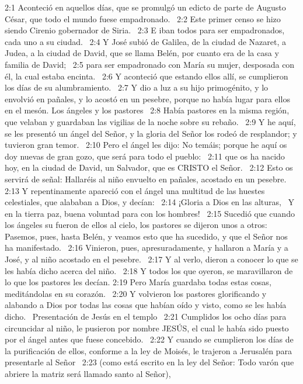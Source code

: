 2:1 Aconteció en aquellos días, que se promulgó un edicto de parte de Augusto César, que todo el mundo fuese empadronado.  
2:2 Este primer censo se hizo siendo Cirenio gobernador de Siria.  
2:3 E iban todos para ser empadronados, cada uno a su ciudad.  
2:4 Y José subió de Galilea, de la ciudad de Nazaret, a Judea, a la ciudad de David, que se llama Belén, por cuanto era de la casa y familia de David;  
2:5 para ser empadronado con María su mujer, desposada con él, la cual estaba encinta.  
2:6 Y aconteció que estando ellos allí, se cumplieron los días de su alumbramiento.  
2:7 Y dio a luz a su hijo primogénito, y lo envolvió en pañales, y lo acostó en un pesebre, porque no había lugar para ellos en el mesón. 
Los ángeles y los pastores  
2:8 Había pastores en la misma región, que velaban y guardaban las vigilias de la noche sobre su rebaño.  
2:9 Y he aquí, se les presentó un ángel del Señor, y la gloria del Señor los rodeó de resplandor; y tuvieron gran temor.  
2:10 Pero el ángel les dijo: No temáis; porque he aquí os doy nuevas de gran gozo, que será para todo el pueblo:  
2:11 que os ha nacido hoy, en la ciudad de David, un Salvador, que es CRISTO el Señor.  
2:12 Esto os servirá de señal: Hallaréis al niño envuelto en pañales, acostado en un pesebre.  
2:13 Y repentinamente apareció con el ángel una multitud de las huestes celestiales, que alababan a Dios, y decían:  
2:14 ¡Gloria a Dios en las alturas,  
Y en la tierra paz, buena voluntad para con los hombres!  
2:15 Sucedió que cuando los ángeles su fueron de ellos al cielo, los pastores se dijeron unos a otros: Pasemos, pues, hasta Belén, y veamos esto que ha sucedido, y que el Señor nos ha manifestado.  
2:16 Vinieron, pues, apresuradamente, y hallaron a María y a José, y al niño acostado en el pesebre.  
2:17 Y al verlo, dieron a conocer lo que se les había dicho acerca del niño.  
2:18 Y todos los que oyeron, se maravillaron de lo que los pastores les decían. 
2:19 Pero María guardaba todas estas cosas, meditándolas en su corazón.  
2:20 Y volvieron los pastores glorificando y alabando a Dios por todas las cosas que habían oído y visto, como se les había dicho.  
Presentación de Jesús en el templo  
2:21 Cumplidos los ocho días para circuncidar al niño, le pusieron por nombre JESÚS, el cual le había sido puesto por el ángel antes que fuese concebido.  
2:22 Y cuando se cumplieron los días de la purificación de ellos, conforme a la ley de Moisés, le trajeron a Jerusalén para presentarle al Señor  
2:23 (como está escrito en la ley del Señor: Todo varón que abriere la matriz será llamado santo al Señor), 
